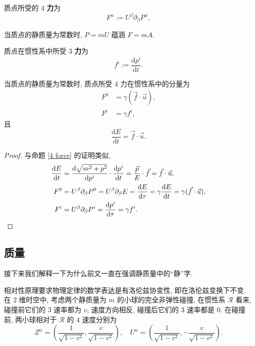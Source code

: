 \begin{definition}[$ 4 $ 力]
    质点所受的 $ 4 $ {\bf 力}为
    \[ F^\alpha:=U^\beta\partial_\beta P^\alpha, \] 
\end{definition}

\begin{remark}
    当质点的静质量为常数时, $ P=mU $ 蕴涵 $ F=mA $.
\end{remark}

\begin{definition}[$ 3 $ 力]
    质点在惯性系中所受 $ 3 $ {\bf 力}为
    \[ f^i:=\frac{\mathrm{d}p^i}{\mathrm{d}t}. \]
\end{definition}

\begin{proposition}
    当质点的静质量为常数时, 质点所受 $ 4 $ 力在惯性系中的分量为
    \begin{align*}
        F^0&=\gamma(\vec{f}\cdot \vec{u}),\\ 
        F^i&=\gamma f^i,
    \end{align*}
    且
    \[ \frac{\mathrm{d}E}{\mathrm{d}t}=\vec{f}\cdot \vec{u}. \]
\end{proposition}
\begin{proof}
    与命题 \ref{4 force} 的证明类似,
    \begin{align*}
        \frac{\mathrm{d}E}{\mathrm{d}t}&=\frac{\mathrm{d}\sqrt{m^2+p^2}}{\mathrm{d}p^i}\cdot\frac{\mathrm{d}p^i}{\mathrm{d}t}=\frac{\vec{p}}{E}\cdot \vec{f}=\vec{f}\cdot \vec{u},\\
        F^0 &= U^\beta\partial_\beta P^0=U^\beta\partial_\beta E=\frac{\mathrm{d}E}{\mathrm{d}\tau}=\gamma\frac{\mathrm{d}E}{\mathrm{d}t}=\gamma(\vec{f}\cdot \vec{u}),\\
        F^i &= U^\beta\partial_\beta P^i=\frac{\mathrm{d}p^i}{\mathrm{d}\tau}=\gamma f^i.\qedhere
    \end{align*}
\end{proof}

\subsection{质量}
接下来我们解释一下为什么前文一直在强调静质量中的``静''字.

相对性原理要求物理定律的数学表达是有洛伦兹协变性, 即在洛伦兹变换下不变. 在 $ 2 $ 维时空中, 考虑两个静质量为 $ m $ 的小球的完全非弹性碰撞, 在惯性系 $ \mathcal{R} $ 看来, 碰撞前它们的 $ 3 $ 速率都为 $ v $, 速度方向相反, 碰撞后它们的 $ 3 $ 速率都是 $ 0 $. 在碰撞前, 两小球相对于 $ \mathcal{R} $ 的 $ 4 $ 速度分别为
\[ Z^\alpha = \left( \frac{1}{\sqrt{1-v^2}},\frac{v}{\sqrt{1-v^2}} \right),\quad U^\alpha = \left( \frac{1}{\sqrt{1-v^2}},-\frac{v}{\sqrt{1-v^2}} \right). \]

